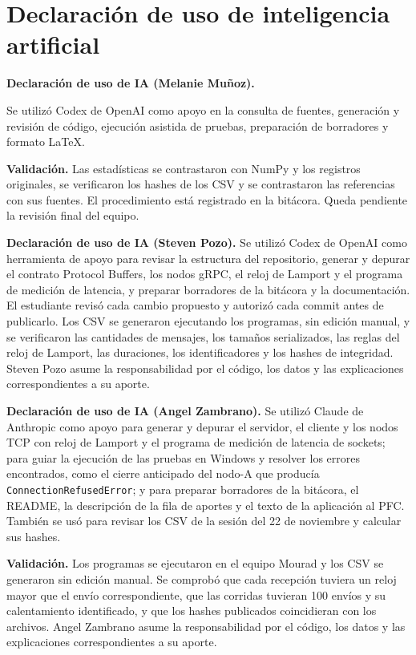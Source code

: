 \section{Declaración de uso de inteligencia artificial}
\label{sec:uso-ia}

\textbf{Declaración de uso de IA (Melanie Muñoz).}

Se utilizó Codex de OpenAI como apoyo en la consulta de fuentes,
generación y revisión de código, ejecución asistida de pruebas,
preparación de borradores y formato LaTeX.

\textbf{Validación.} Las estadísticas se contrastaron con NumPy y los
registros originales, se verificaron los hashes de los CSV y se
contrastaron las referencias con sus fuentes. El procedimiento está
registrado en la bitácora. Queda pendiente la revisión final del equipo.

\textbf{Declaración de uso de IA (Steven Pozo).}
Se utilizó Codex de OpenAI como herramienta de apoyo para revisar la
estructura del repositorio, generar y depurar el contrato Protocol
Buffers, los nodos gRPC, el reloj de Lamport y el programa de medición de
latencia, y preparar borradores de la bitácora y la documentación. El
estudiante revisó cada cambio propuesto y autorizó cada commit antes de
publicarlo. Los CSV se generaron ejecutando los programas, sin edición
manual, y se verificaron las cantidades de mensajes, los tamaños
serializados, las reglas del reloj de Lamport, las duraciones, los
identificadores y los hashes de integridad. Steven Pozo asume la
responsabilidad por el código, los datos y las explicaciones
correspondientes a su aporte.

\textbf{Declaración de uso de IA (Angel Zambrano).}
Se utilizó Claude de Anthropic como apoyo para generar y depurar el
servidor, el cliente y los nodos TCP con reloj de Lamport y el programa
de medición de latencia de sockets; para guiar la ejecución de las
pruebas en Windows y resolver los errores encontrados, como el cierre
anticipado del nodo-A que producía \texttt{ConnectionRefusedError}; y
para preparar borradores de la bitácora, el README, la descripción de
la fila de aportes y el texto de la aplicación al PFC. También se usó
para revisar los CSV de la sesión del 22 de noviembre y calcular sus
hashes.

\textbf{Validación.} Los programas se ejecutaron en el equipo Mourad y
los CSV se generaron sin edición manual. Se comprobó que cada recepción
tuviera un reloj mayor que el envío correspondiente, que las corridas
tuvieran 100 envíos y su calentamiento identificado, y que los hashes
publicados coincidieran con los archivos. Angel Zambrano asume la
responsabilidad por el código, los datos y las explicaciones
correspondientes a su aporte.

